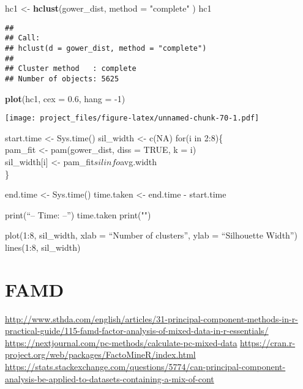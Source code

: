 \documentclass[
]{article}
\newenvironment{Shaded}{\begin{snugshade}}{\end{snugshade}}
\newcommand{\DataTypeTok}[1]{\textcolor[rgb]{0.13,0.29,0.53}{#1}}
\newcommand{\DecValTok}[1]{\textcolor[rgb]{0.00,0.00,0.81}{#1}}
\newcommand{\FloatTok}[1]{\textcolor[rgb]{0.00,0.00,0.81}{#1}}
\newcommand{\KeywordTok}[1]{\textcolor[rgb]{0.13,0.29,0.53}{\textbf{#1}}}
\newcommand{\NormalTok}[1]{#1}
\newcommand{\StringTok}[1]{\textcolor[rgb]{0.31,0.60,0.02}{#1}}
\begin{document}
\begin{Shaded}
\begin{Highlighting}[]
\NormalTok{hc1 <-}\StringTok{ }\KeywordTok{hclust}\NormalTok{(gower_dist, }\DataTypeTok{method =} \StringTok{"complete"}\NormalTok{ )}
\NormalTok{hc1}
\end{Highlighting}
\end{Shaded}

\begin{verbatim}
## 
## Call:
## hclust(d = gower_dist, method = "complete")
## 
## Cluster method   : complete 
## Number of objects: 5625
\end{verbatim}

\begin{Shaded}
\begin{Highlighting}[]
\KeywordTok{plot}\NormalTok{(hc1, }\DataTypeTok{cex =} \FloatTok{0.6}\NormalTok{, }\DataTypeTok{hang =} \DecValTok{-1}\NormalTok{)}
\end{Highlighting}
\end{Shaded}

\texttt{[image: project\_files/figure-latex/unnamed-chunk-70-1.pdf]}

start.time \textless- Sys.time() sil\_width \textless- c(NA) for(i in
2:8)\{\\
pam\_fit \textless- pam(gower\_dist, diss = TRUE, k = i)\\
sil\_width{[}i{]} \textless- pam\_fit\(silinfo\)avg.width\\
\}

end.time \textless- Sys.time() time.taken \textless- end.time -
start.time

print(``-- Time: --'') time.taken print("")

plot(1:8, sil\_width, xlab = ``Number of clusters'', ylab = ``Silhouette
Width'') lines(1:8, sil\_width)

\hypertarget{famd}{%
\section{FAMD}\label{famd}}

\url{http://www.sthda.com/english/articles/31-principal-component-methods-in-r-practical-guide/115-famd-factor-analysis-of-mixed-data-in-r-essentials/}
\url{https://nextjournal.com/pc-methods/calculate-pc-mixed-data}
\url{https://cran.r-project.org/web/packages/FactoMineR/index.html}
\url{https://stats.stackexchange.com/questions/5774/can-principal-component-analysis-be-applied-to-datasets-containing-a-mix-of-cont}
\end{document}
